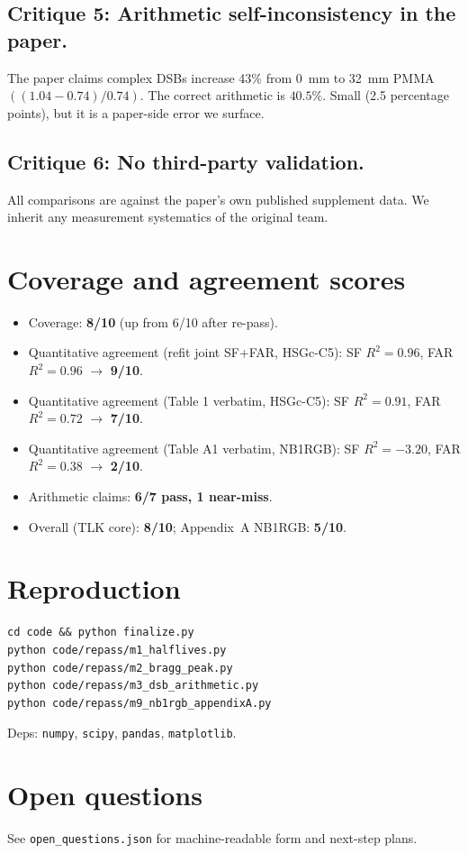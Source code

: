 \documentclass[11pt]{article}
\begin{document}
\subsection*{Critique 5: Arithmetic self-inconsistency in the paper.}
The paper claims complex DSBs increase 43\% from 0~mm to 32~mm PMMA
$((1.04-0.74)/0.74)$. The correct arithmetic is $40.5\%$. Small
(2.5 percentage points), but it is a paper-side error we surface.

\subsection*{Critique 6: No third-party validation.}
All comparisons are against the paper's own published supplement data.
We inherit any measurement systematics of the original team.

\section{Coverage and agreement scores}
\begin{itemize}
  \item Coverage: \textbf{8/10} (up from 6/10 after re-pass).
  \item Quantitative agreement (refit joint SF+FAR, HSGc-C5): SF $R^2{=}0.96$,
        FAR $R^2{=}0.96$ $\to$ \textbf{9/10}.
  \item Quantitative agreement (Table 1 verbatim, HSGc-C5): SF $R^2{=}0.91$,
        FAR $R^2{=}0.72$ $\to$ \textbf{7/10}.
  \item Quantitative agreement (Table A1 verbatim, NB1RGB): SF $R^2{=}-3.20$,
        FAR $R^2{=}0.38$ $\to$ \textbf{2/10}.
  \item Arithmetic claims: \textbf{6/7 pass, 1 near-miss}.
  \item Overall (TLK core): \textbf{8/10}; Appendix~A NB1RGB: \textbf{5/10}.
\end{itemize}

\section{Reproduction}
\begin{verbatim}
cd code && python finalize.py
python code/repass/m1_halflives.py
python code/repass/m2_bragg_peak.py
python code/repass/m3_dsb_arithmetic.py
python code/repass/m9_nb1rgb_appendixA.py
\end{verbatim}
Deps: \texttt{numpy}, \texttt{scipy}, \texttt{pandas}, \texttt{matplotlib}.

\section{Open questions}
See \texttt{open\_questions.json} for machine-readable form and next-step plans.


\end{document}
